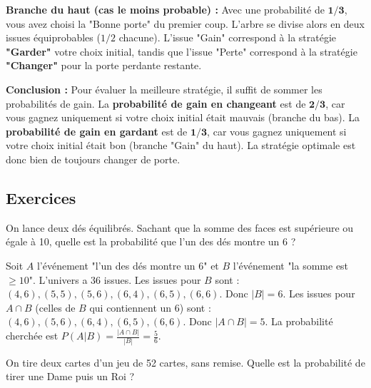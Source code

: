 \begin{proofbox}
\vspace{0.3cm}
\noindent\textbf{Branche du haut (cas le moins probable) :}
\newline
Avec une probabilité de $\mathbf{1/3}$, vous avez choisi la "Bonne porte" du premier coup. L'arbre se divise alors en deux issues équiprobables ($1/2$ chacune). L'issue "Gain" correspond à la stratégie \textbf{"Garder"} votre choix initial, tandis que l'issue "Perte" correspond à la stratégie \textbf{"Changer"} pour la porte perdante restante.

\vspace{0.3cm}
\noindent\textbf{Conclusion :}
\newline
Pour évaluer la meilleure stratégie, il suffit de sommer les probabilités de gain. La \textbf{probabilité de gain en changeant} est de $\mathbf{2/3}$, car vous gagnez uniquement si votre choix initial était mauvais (branche du bas). La \textbf{probabilité de gain en gardant} est de $\mathbf{1/3}$, car vous gagnez uniquement si votre choix initial était bon (branche "Gain" du haut). La stratégie optimale est donc bien de toujours changer de porte.
\end{proofbox}

\subsection{Exercices}

\begin{exercicebox}
On lance deux dés équilibrés. Sachant que la somme des faces est supérieure ou égale à 10, quelle est la probabilité que l'un des dés montre un 6 ?
\end{exercicebox}

\begin{correctionbox}
Soit $A$ l'événement "l'un des dés montre un 6" et $B$ l'événement "la somme est $\ge 10$".
L'univers a 36 issues.
Les issues pour $B$ sont : $(4,6), (5,5), (5,6), (6,4), (6,5), (6,6)$. Donc $|B| = 6$.
Les issues pour $A \cap B$ (celles de $B$ qui contiennent un 6) sont : $(4,6), (5,6), (6,4), (6,5), (6,6)$. Donc $|A \cap B| = 5$.
La probabilité cherchée est $P(A|B) = \frac{|A \cap B|}{|B|} = \frac{5}{6}$.
\end{correctionbox}

\begin{exercicebox}
On tire deux cartes d'un jeu de 52 cartes, sans remise. Quelle est la probabilité de tirer une Dame puis un Roi ?
\end{exercicebox}

